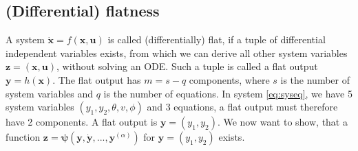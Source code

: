\documentclass[a4paper,11pt,headings=standardclasses,parskip=half]{scrartcl}
\newcommand{\uu}{\mathbf{u}}
\newcommand{\x}{\mathbf{x}}
\newcommand{\y}{\mathbf{y}}
\newcommand{\z}{\mathbf{z}}
\begin{document}
\subsection{(Differential) flatness}
A system $\dot{\x}=f(\x,\uu)$ is called (differentially) flat, if a tuple of differential independent variables exists, from which we can derive all other system variables $\z=(\x,\uu)$, without solving an ODE. Such a tuple is called a flat output $\y=h(\x)$. The flat output has $m = s-q$ components, where $s$ is the number of system variables and $q$ is the number of equations. In system \eqref{eq:syseq}, we have 5 system variables $(y_1,y_2, \theta,v, \phi) $ and 3 equations, a flat output must therefore have 2 components. A flat output is $\y=(y_1,y_2)$. We now want to show, that a function $\z = \mathbf{\psi}(\y,\dot{\y},...,\y^{(\alpha)})$ for $\y=(y_1,y_2)$ exists.
\end{document}
